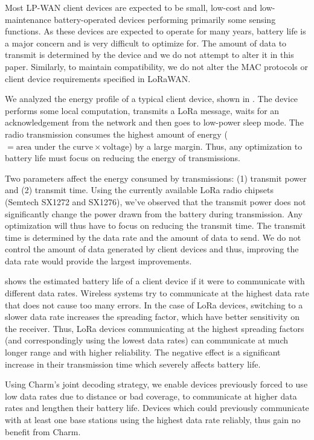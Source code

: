 Most LP-WAN client devices are expected to be small, low-cost and low-maintenance battery-operated devices performing primarily some sensing functions. As these devices are expected to operate for many years, battery life is a major concern and is very difficult to optimize for. The amount of data to transmit is determined by the device and we do not attempt to alter it in this paper. Similarly, to maintain compatibility, we do not alter the MAC protocols or client device requirements specified in LoRaWAN.

We analyzed the energy profile of a typical client device, shown in . The device performs some local computation, transmits a LoRa message, waits for an acknowledgement from the network and then goes to low-power sleep mode. The radio transmission consumes the highest amount of energy ($= \text{area under the curve} \times \text{voltage}$) by a large margin. Thus, any optimization to battery life must focus on reducing the energy of transmissions.

Two parameters affect the energy consumed by transmissions: (1) transmit power and (2) transmit time. Using the currently available LoRa radio chipsets (Semtech SX1272 and SX1276), we've observed that the transmit power does not significantly change the power drawn from the battery during transmission. Any optimization will thus have to focus on reducing the transmit time. The transmit time is determined by the data rate and the amount of data to send. We do not control the amount of data generated by client devices and thus, improving the data rate would provide the largest improvements.

 shows the estimated battery life of a client device if it were to communicate with different data rates. Wireless systems try to communicate at the highest data rate that does not cause too many errors. In the case of LoRa devices, switching to a slower data rate increases the spreading factor,  which have better sensitivity on the receiver. Thus, LoRa devices communicating at the highest spreading factors (and correspondingly using the lowest data rates) can communicate at much longer range and with higher reliability. The negative effect is a significant increase in their transmission time which severely affects battery life.

Using Charm's joint decoding strategy, we enable devices previously forced to use low data rates due to distance or bad coverage, to communicate at higher data rates and lengthen their battery life. Devices which could previously communicate with at least one base stations using the highest data rate reliably, thus gain no benefit from Charm.

